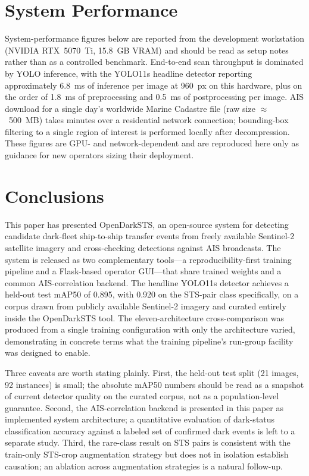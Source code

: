\documentclass[10pt, letterpaper, twocolumn]{article}
\begin{document}
\section{System Performance}
\label{sec:sysperf}

System-performance figures below are reported from the development workstation (NVIDIA RTX~5070~Ti, 15.8~GB VRAM) and should be read as setup notes rather than as a controlled benchmark. End-to-end scan throughput is dominated by YOLO inference, with the YOLO11s headline detector reporting approximately 6.8~ms of inference per image at 960~px on this hardware, plus on the order of 1.8~ms of preprocessing and 0.5~ms of postprocessing per image. AIS download for a single day's worldwide Marine Cadastre file (raw size $\approx$~500~MB) takes minutes over a residential network connection; bounding-box filtering to a single region of interest is performed locally after decompression. These figures are GPU- and network-dependent and are reproduced here only as guidance for new operators sizing their deployment.


\section{Conclusions}
\label{sec:conclusions}

This paper has presented OpenDarkSTS, an open-source system for detecting candidate dark-fleet ship-to-ship transfer events from freely available Sentinel-2 satellite imagery and cross-checking detections against AIS broadcasts. The system is released as two complementary tools---a reproducibility-first training pipeline and a Flask-based operator GUI---that share trained weights and a common AIS-correlation backend. The headline YOLO11s detector achieves a held-out test mAP50 of 0.895, with 0.920 on the STS-pair class specifically, on a corpus drawn from publicly available Sentinel-2 imagery and curated entirely inside the OpenDarkSTS tool. The eleven-architecture cross-comparison was produced from a single training configuration with only the architecture varied, demonstrating in concrete terms what the training pipeline's run-group facility was designed to enable.

Three caveats are worth stating plainly. First, the held-out test split (21 images, 92 instances) is small; the absolute mAP50 numbers should be read as a snapshot of current detector quality on the curated corpus, not as a population-level guarantee. Second, the AIS-correlation backend is presented in this paper as implemented system architecture; a quantitative evaluation of dark-status classification accuracy against a labeled set of confirmed dark events is left to a separate study. Third, the rare-class result on STS pairs is consistent with the train-only STS-crop augmentation strategy but does not in isolation establish causation; an ablation across augmentation strategies is a natural follow-up.
\end{document}
